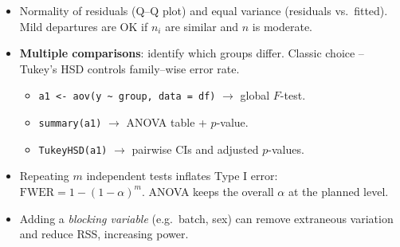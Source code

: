 \documentclass[12pt]{book}
\begin{document}
\begin{itemize}
  \item Normality of residuals (Q–Q plot) and equal variance (residuals vs.\ fitted).
        Mild departures are OK if \(n_{i}\) are similar and \(n\) is moderate.

  \item \textbf{Multiple comparisons}: identify which groups differ.  
        Classic choice – Tukey’s HSD controls family–wise error rate.

  \begin{itemize}
    \setlength{\itemsep}{0pt}
    \item \verb|a1 <- aov(y ~ group, data = df)| \hfill\(\rightarrow\) global \(F\)-test.
    \item \verb|summary(a1)| \hfill\(\rightarrow\) ANOVA table + \(p\)-value.
    \item \verb|TukeyHSD(a1)| \hfill\(\rightarrow\) pairwise CIs and adjusted \(p\)-values.
  \end{itemize}

  \item Repeating \(m\) independent tests inflates Type I error:
        \(\text{FWER}=1-(1-\alpha)^{m}\).  
        ANOVA keeps the overall \(\alpha\) at the planned level.

  \item Adding a \emph{blocking variable} (e.g.\ batch, sex) can remove
        extraneous variation and reduce RSS, increasing power.
\end{itemize}


\newpage
\pagestyle{fancy}
\end{document}
